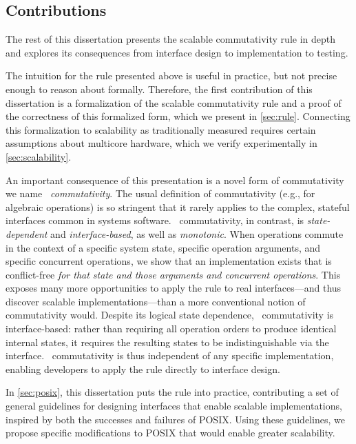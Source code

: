 \subsection{Contributions}


The rest of this dissertation presents the scalable commutativity rule
in depth and explores its consequences from interface design to
implementation to testing.

The intuition for the rule presented above is useful in practice, but
not precise enough to reason
about formally.
%
Therefore, the first contribution of this dissertation is a
formalization of the scalable commutativity rule and a proof of the
correctness of this formalized form, which we present in
\cref{sec:rule}.
%
Connecting this formalization to scalability as traditionally measured
requires certain assumptions about multicore hardware, which we verify
experimentally in \cref{sec:scalability}.

An important consequence of this presentation is a novel form of
commutativity we name \emph{\SIM\ commutativity}.
%
The usual definition of commutativity (e.g., for algebraic operations)
is so stringent that it rarely applies to the complex, stateful
interfaces common in systems software.
%
\SIM\ commutativity, in contrast, is \emph{state-dependent} and
\emph{interface-based}, as well as \emph{monotonic}.
%
When operations commute in the context of a specific system state,
specific operation arguments, and specific concurrent operations, we
show that an implementation exists that is conflict-free \emph{for that state
  and those arguments and concurrent operations}.
%
This exposes many more opportunities to apply the rule to real
interfaces---and thus discover scalable implementations---than a more
conventional notion of commutativity would.
%
Despite its logical state dependence, \SIM\ commutativity is
interface-based: rather than requiring all operation orders to produce
identical internal states, it requires the resulting states to be
indistinguishable via the interface.
%
\SIM\ commutativity is thus independent of any specific
implementation, enabling developers to apply the rule directly to
interface design.

In \cref{sec:posix}, this dissertation puts the rule into practice,
contributing a set of general guidelines for designing interfaces that
enable scalable implementations, inspired by both the successes and
failures of POSIX.
%
Using these guidelines, we propose specific modifications to POSIX
that would enable greater scalability.

